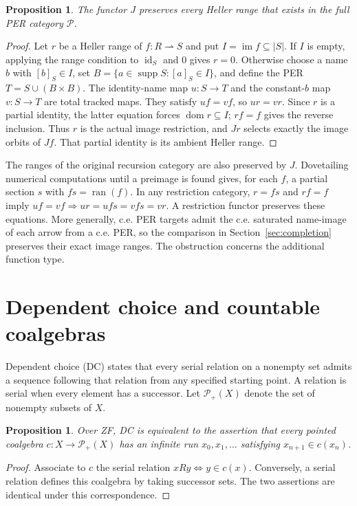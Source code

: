 \documentclass[11pt]{article}
\newtheorem{proposition}[theorem]{Proposition}
\theoremstyle{definition}
\newcommand{\Pcat}{\mathcal P}
\newcommand{\supp}{\operatorname{supp}}
\newcommand{\dom}{\operatorname{dom}}
\newcommand{\id}{\operatorname{id}}
\newcommand{\ran}{\operatorname{ran}}
\begin{document}
\begin{proposition}\label{prop:existing-ranges}
The functor $J$ preserves every Heller range that exists in the full
PER category $\Pcat$.
\end{proposition}
\begin{proof}
Let $r$ be a Heller range of $f:R\rightharpoonup S$ and put
$I=\operatorname{im}f\subseteq|S|$. If $I$ is empty, applying
the range condition to $\id_S$ and $0$ gives $r=0$.
Otherwise choose a name $b$ with $[b]_S\in I$, set
$B=\{a\in\supp S:[a]_S\in I\}$, and define the PER
$T=S\cup(B\times B)$. The identity-name map $u:S\to T$
and the constant-$b$ map $v:S\to T$ are total tracked maps.
They satisfy $uf=vf$, so $ur=vr$. Since $r$ is a partial
identity, the latter equation forces $\dom r\subseteq I$;
$rf=f$ gives the reverse inclusion. Thus $r$ is the actual
image restriction, and $Jr$ selects exactly the image orbits of
$Jf$. That partial identity is its ambient Heller range.
\end{proof}

The ranges of the original recursion category are also
preserved by $J$. Dovetailing numerical computations until a preimage
is found gives, for each $f$, a partial section $s$ with
$fs=\ran(f)$. In any restriction
category, $r=fs$ and $rf=f$ imply
$uf=vf\Rightarrow ur=ufs=vfs=vr$. A restriction functor
preserves these equations. More generally, c.e. PER targets admit
the c.e. saturated name-image of each arrow from a c.e. PER, so the
comparison in Section~\ref{sec:completion} preserves their exact
image ranges. The obstruction concerns the additional function type.

\section{Dependent choice and countable coalgebras}

Dependent choice (DC) states that every serial relation on a nonempty
set admits a sequence following that relation from any specified
starting point. A relation is serial when every element has a successor.
Let $\mathcal P_+(X)$ denote the set of nonempty subsets of $X$.

\begin{proposition}
Over ZF, DC is equivalent to the assertion that every pointed
coalgebra $c:X\to\mathcal P_+(X)$ has an infinite run
$x_0,x_1,\ldots$ satisfying $x_{n+1}\in c(x_n)$.
\end{proposition}
\begin{proof}
Associate to $c$ the serial relation $xRy\iff y\in c(x)$.
Conversely, a serial relation defines this coalgebra by taking
successor sets. The two assertions are identical under this
correspondence.
\end{proof}
\end{document}
